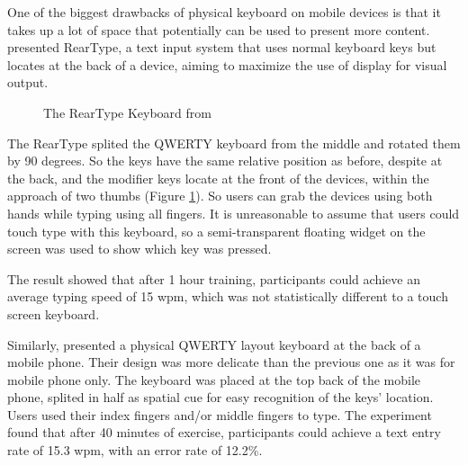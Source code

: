 \documentclass[11pt]{article}
\begin{document}
One of the biggest drawbacks of physical keyboard on mobile devices is that it takes up a lot of space that potentially can be used to present more content. \citet{10.1145/1851600.1851630} presented RearType, a text input system that uses normal keyboard keys but locates at the back of a device, aiming to maximize the use of display for visual output. 
\begin{figure}[H]
\centering
{}\hfill
{}\hfill
\caption{The RearType Keyboard from \citep{10.1145/1851600.1851630}} \label{fig:rearType}
\end{figure}
The RearType splited the QWERTY keyboard from the middle and rotated them by 90 degrees. So the keys have the same relative position as before, despite at the back, and the modifier keys locate at the front of the devices, within the approach of two thumbs (Figure \ref{fig:rearType}). So users can grab the devices using both hands while typing using all fingers. It is unreasonable to assume that users could touch type with this keyboard, so a semi-transparent floating widget on the screen was used to show which key was pressed.

The result showed that after 1 hour training, participants could achieve an average typing speed of 15 wpm, which was not statistically different to a touch screen keyboard. 

Similarly, \citet{10.1145/2212776.2223676} presented a physical QWERTY layout keyboard at the back of a mobile phone. Their design was more delicate than the previous one as it was for mobile phone only. The keyboard was placed at the top back of the mobile phone, splited in half as spatial cue for easy recognition of the keys' location. Users used their index fingers and/or middle fingers to type. The experiment found that after 40 minutes of exercise, participants could achieve a text entry rate of 15.3 wpm, with an error rate of 12.2\%. 
\end{document}
